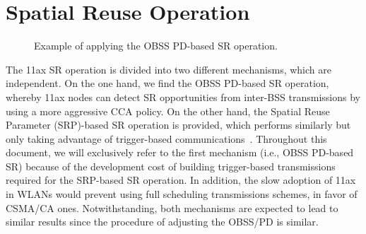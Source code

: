 \documentclass[conference]{IEEEtran}
\begin{document}
	\section{Spatial Reuse Operation}
	\label{section:sr_operation}
	
	\begin{figure}[ht!!!!]
		\centering
		\caption{Example of applying the OBSS PD-based SR operation.}
		\label{fig:scenario_example_2}
	\end{figure}
	
	The 11ax SR operation is divided into two different mechanisms, which are independent. On the one hand, we find the OBSS PD-based SR operation, whereby 11ax nodes can detect SR opportunities from inter-BSS transmissions by using a more aggressive CCA policy. On the other hand, the Spatial Reuse Parameter (SRP)-based SR operation is provided, which performs similarly but only taking advantage of trigger-based communications~\cite{bellalta2019ap}. Throughout this document, we will exclusively refer to the first mechanism (i.e., OBSS PD-based SR) because of the development cost of building trigger-based transmissions required for the SRP-based SR operation. In addition, the slow adoption of 11ax in WLANs would prevent using full scheduling transmissions schemes, in favor of CSMA/CA ones. Notwithstanding, both mechanisms are expected to lead to similar results since the procedure of adjusting the OBSS/PD is similar.
	
\end{document}
